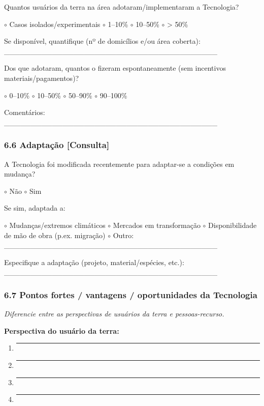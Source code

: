 Quantos usuários da terra na área adotaram/implementaram a Tecnologia?

$\circ$ Casos isolados/experimentais $\circ$ 1--10\% $\circ$ 10--50\% $\circ$ \textgreater{} 50\%

Se disponível, quantifique (nº de domicílios e/ou área coberta): \_\_\_\_\_\_\_\_\_\_\_\_\_\_\_\_\_\_\_\_\_\_\_\_\_\_\_\_\_\_\_\_\_\_\_\_\_\_\_\_

Dos que adotaram, quantos o fizeram espontaneamente (sem incentivos materiais/pagamentos)?

$\circ$ 0--10\% $\circ$ 10--50\% $\circ$ 50--90\% $\circ$ 90--100\%

Comentários: \_\_\_\_\_\_\_\_\_\_\_\_\_\_\_\_\_\_\_\_\_\_\_\_\_\_\_\_\_\_\_\_\_\_\_\_\_\_\_\_

\subsubsection{6.6 Adaptação {[Consulta]}}\label{adaptauxe7uxe3o}

A Tecnologia foi modificada recentemente para adaptar-se a condições em mudança?

$\circ$ Não $\circ$ Sim

Se sim, adaptada a:

$\circ$ Mudanças/extremos climáticos $\circ$ Mercados em transformação $\circ$ Disponibilidade de mão de obra (p.ex. migração) $\circ$ Outro: \_\_\_\_\_\_\_\_\_\_\_\_\_\_\_\_\_\_\_\_\_\_\_\_\_\_\_\_\_\_\_\_\_\_\_\_\_\_\_\_

Especifique a adaptação (projeto, material/espécies, etc.): \_\_\_\_\_\_\_\_\_\_\_\_\_\_\_\_\_\_\_\_\_\_\_\_\_\_\_\_\_\_\_\_\_\_\_\_\_\_\_\_

\subsubsection{6.7 Pontos fortes / vantagens / oportunidades da Tecnologia}\label{pontos-fortes-vantagens-oportunidades-da-tecnologia}

\emph{Diferencie entre as perspectivas de usuários da terra e pessoas-recurso.}

\textbf{Perspectiva do usuário da terra:}

\begin{enumerate}
\def\labelenumi{\arabic{enumi}.}
\item
  \begin{center}\rule{0.5\linewidth}{0.5pt}\end{center}
\item
  \begin{center}\rule{0.5\linewidth}{0.5pt}\end{center}
\item
  \begin{center}\rule{0.5\linewidth}{0.5pt}\end{center}
\item
  \begin{center}\rule{0.5\linewidth}{0.5pt}\end{center}
\end{enumerate}

